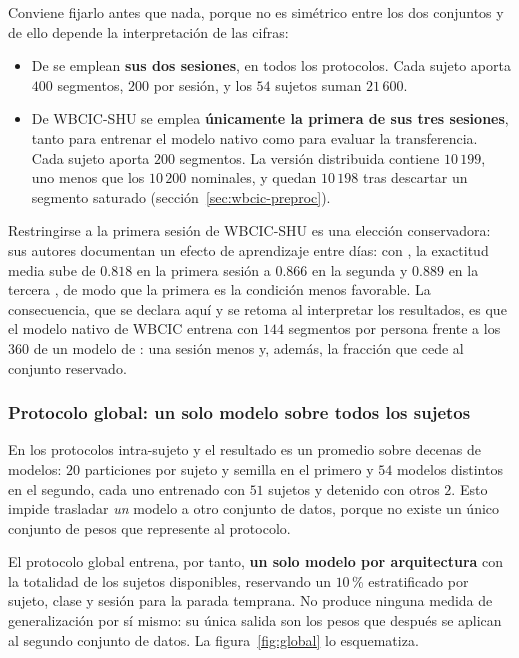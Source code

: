 Conviene fijarlo antes que nada, porque no es simétrico entre los dos conjuntos y de ello
depende la interpretación de las cifras:

\begin{itemize}
  \item De \openbmi{} se emplean \textbf{sus dos sesiones}, en todos los protocolos. Cada
  sujeto aporta $400$ segmentos, $200$ por sesión, y los $54$ sujetos suman $21\,600$.
  \item De WBCIC-SHU se emplea \textbf{únicamente la primera de sus tres sesiones}, tanto
  para entrenar el modelo nativo como para evaluar la transferencia. Cada sujeto aporta
  $200$ segmentos. La versión distribuida contiene $10\,199$, uno menos que los $10\,200$
  nominales, y quedan $10\,198$ tras descartar un segmento saturado
  (sección~\ref{sec:wbcic-preproc}).
\end{itemize}

Restringirse a la primera sesión de WBCIC-SHU es una elección conservadora: sus autores
documentan un efecto de aprendizaje entre días: con \eegnet{}, la exactitud media sube de
$0.818$ en la primera sesión a $0.866$ en la segunda y $0.889$ en la tercera
\cite{yang2025wbcic}, de modo que la primera es la
condición menos favorable. La consecuencia, que se declara aquí y se retoma al interpretar
los resultados, es que el modelo nativo de WBCIC entrena con $144$ segmentos por persona
frente a los $360$ de un modelo de \openbmi{}: una sesión menos y, además, la fracción que
cede al conjunto reservado.

\subsubsection{Protocolo global: un solo modelo sobre todos los sujetos}

En los protocolos intra-sujeto y \loso{} el resultado es un promedio sobre decenas de
modelos: $20$ particiones por sujeto y semilla en el primero y $54$ modelos distintos en el segundo,
cada uno entrenado con $51$ sujetos y detenido con otros $2$. Esto impide trasladar \emph{un} modelo a otro conjunto de
datos, porque no existe un único conjunto de pesos que represente al protocolo.

El protocolo global entrena, por tanto, \textbf{un solo modelo por arquitectura} con la
totalidad de los sujetos disponibles, reservando un $10$\,\% estratificado por sujeto, clase
y sesión para la parada temprana. No produce ninguna medida de generalización por sí mismo:
su única salida son los pesos que después se aplican al segundo conjunto de datos. La
figura~\ref{fig:global} lo esquematiza.

